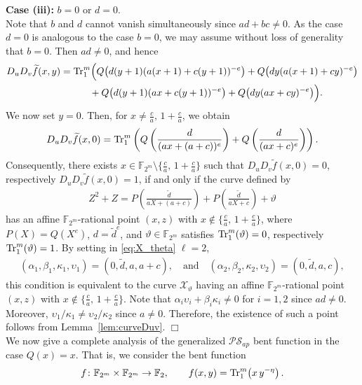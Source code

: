 \documentclass[12pt]{article}
\theoremstyle{plain}
\theoremstyle{definition}
\newcommand{\F}{\mathbb{F}}
\renewcommand{\to}{\rightarrow}
\newcommand{\Tr}{{\rm Tr}}
\begin{document}
	\medskip
	
	\noindent \textbf{Case (iii):} $b=0$ or $d=0 $. \\[.3em]
	Note that $b$ and $d$ cannot vanish simultaneously since $ad+bc \neq 0$.
	As the case $d=0$ is analogous to the case $b=0$, we may assume without loss of generality that $b=0$.
	Then $ad \neq 0$, and hence
	\begin{align*}
		D_uD_v\widetilde{f}(x,y)
		&= \Tr^m_1\Big(
		Q\big(d(y+1)(a(x+1)+c(y+1))^{-e}\big)
		+Q\big(dy(a(x+1)+cy)^{-e}\big)  \\
		&\qquad\quad
		+Q\big(d(y+1)(ax+c(y+1))^{-e}\big)
		+Q\big(dy(ax+cy)^{-e}\big)
		\Big).
	\end{align*}
	We now set $y=0$. Then, for $x \neq  \tfrac{c}{a},\, 1+\tfrac{c}{a}$, we obtain
	\begin{align*}
		D_uD_v\widetilde{f}(x,0)
		= \Tr^m_1\left(
		Q\left( \frac{d}{(ax+(a+c))^{e}}\right)
		+Q\left( \frac{d}{(ax+c)^{e}}\right)
		\right).
	\end{align*}
	Consequently, there exists
	$x \in \mathbb{F}_{2^m} \setminus \{ \tfrac{c}{a},\, 1+\tfrac{c}{a} \}$
	such that $D_uD_v\tilde{f}(x,0)=0$, respectively $D_uD_v\tilde{f}(x,0)=1$,
	if and only if the curve defined by
	\begin{align*}
		Z^2+Z
		=
		P\left( \frac{\tilde{d}}{aX+(a+c)} \right)
		+P\left( \frac{\tilde{d}}{aX+c} \right)
		+\vartheta
	\end{align*}
	has an affine $\F_{2^m}$-rational point $(x,z)$ with 
	$x \notin \{ \tfrac{c}{a},\, 1+\tfrac{c}{a} \}$,
	where $P(X)=Q(X^e)$, $d=\tilde{d}^e$, and
	$\vartheta \in \mathbb{F}_{2^m}$ satisfies
	$\Tr^m_1(\vartheta)=0$, respectively $\Tr^m_1(\vartheta)=1$.
	By setting in \eqref{eq:X_theta} $\ell=2$,
	\begin{align*}
		(\alpha_1,\beta_1,\kappa_1,\upsilon_1)=(0,\tilde{d},a,a+c),
		\quad \text{and} \quad
		({\alpha_2},{\beta_2},{\kappa_2},{\upsilon_2})=(0,\tilde{d},a,c),
	\end{align*}
	this condition is equivalent to the curve $\mathcal{X}_\vartheta$ having an affine $\F_{2^m}$-rational point $(x,z)$ with
	$x \notin \{ \tfrac{c}{a},\, 1+\tfrac{c}{a} \}$.
	Note that
	$\alpha_i\upsilon_i+\beta_i\kappa_i \neq 0$ for $i=1,2$
	since $ad \neq 0$.
	Moreover,
	$\upsilon_1/\kappa_1 \neq {\upsilon}_2/{\kappa}_2$ since $a\neq 0$.
	Therefore, the existence of such a point follows from
	Lemma~\ref{lem:curveDuv}.
	\hfill$\Box$\\[.5em]
	
	We now give a complete analysis of the generalized $\mathcal{PS}_{ap}$ bent function in the case $Q(x)=x$.
	That is, we consider the bent function
	\[
	f \colon \mathbb{F}_{2^{m}} \times \mathbb{F}_{2^{m}} \to \mathbb{F}_2,
	\qquad
	f(x,y)=\Tr_1^{m}\!\left(x\,y^{-\eta}\right).
	\]
\end{document}
